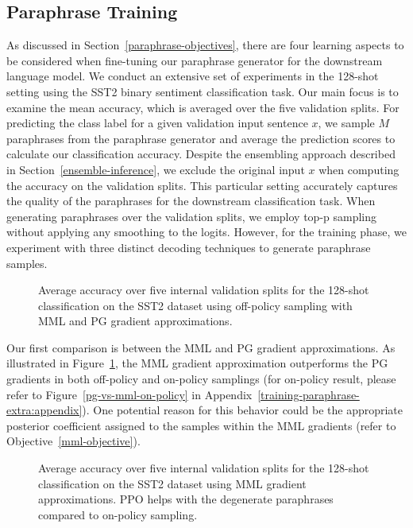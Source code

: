 \documentclass[11pt]{article}
\begin{document}
\subsection{Paraphrase Training}
\label{final-lmfps-result}
As discussed in Section~\ref{paraphrase-objectives}, there are four learning aspects to be considered when fine-tuning our paraphrase generator for the downstream language model. We conduct an extensive set of experiments in the 128-shot setting using the SST2 binary sentiment classification task. Our main focus is to examine the mean accuracy, which is averaged over the five validation splits. For predicting the class label for a given validation input sentence $x$, we sample $M$ paraphrases from the paraphrase generator and average the prediction scores to calculate our classification accuracy. Despite the ensembling approach described in Section~\ref{ensemble-inference}, we exclude the original input $x$ when computing the accuracy on the validation splits. This particular setting accurately captures the quality of the paraphrases for the downstream classification task. When generating paraphrases over the validation splits, we employ top-p sampling without applying any smoothing to the logits. However, for the training phase, we experiment with three distinct decoding techniques to generate paraphrase samples.

\begin{figure}[h]

\begin{center}

\end{center}
\caption{Average accuracy over five internal validation splits for the 128-shot classification on the SST2 dataset using off-policy sampling with MML and PG gradient approximations.}
\label{pg-vs-mml-off-policy}
\end{figure}

Our first comparison is between the MML and PG gradient approximations. As illustrated in Figure~\ref{pg-vs-mml-off-policy}, the MML gradient approximation outperforms the PG gradients in both off-policy and on-policy samplings (for on-policy result, please refer to Figure~\ref{pg-vs-mml-on-policy} in Appendix~\ref{training-paraphrase-extra:appendix}). One potential reason for this behavior could be the appropriate posterior coefficient assigned to the samples within the MML gradients (refer to Objective~\ref{mml-objective}).

\begin{figure}[h]
\begin{center}

\end{center}
\caption{Average accuracy over five internal validation splits for the 128-shot classification on the SST2 dataset using MML gradient approximations. PPO helps with the degenerate paraphrases compared to on-policy sampling.}
\label{mml-vs-ppo}
\end{figure}
\end{document}
